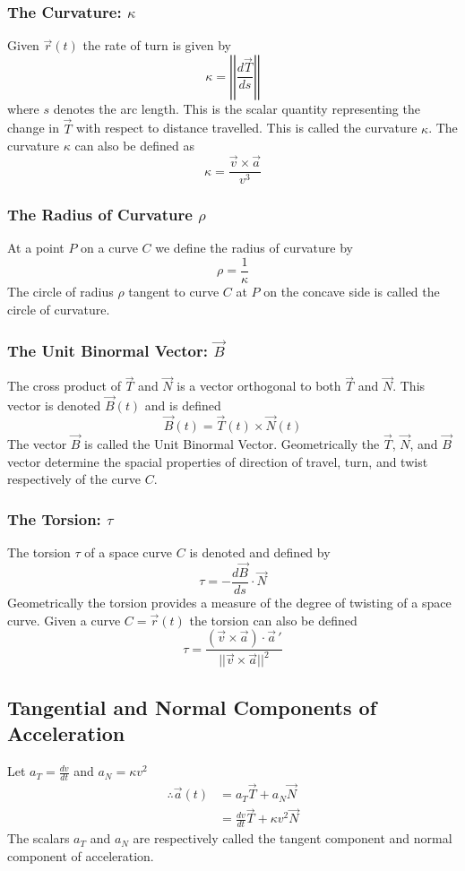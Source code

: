 \documentclass[14pt]{article}
\begin{document}
    \subsubsection{The Curvature: $\kappa$}
    Given $\vec r(t)$ the rate of turn is given by $$\kappa=\left|\left|\frac{d\vec T}{ds}\right|\right|$$ where $s$ denotes the arc length. This is the scalar quantity representing the change in $\vec T$ with respect to distance  travelled. This is called the curvature $\kappa$. The curvature $\kappa$ can also be defined as
    $$\kappa=\frac{\vec{v}\times\vec{a}}{v^3}$$
    \subsubsection{The Radius of Curvature $\rho$}
    At a point $P$ on a curve $C$ we define the radius of curvature by
    $$\rho=\frac{1}{\kappa}$$
    The circle of radius $\rho$ tangent to curve $C$ at $P$ on the concave side is called the circle of curvature.
    \subsubsection{The Unit Binormal Vector: $\vec B$}
    The cross product of $\vec T$ and $\vec N$ is a vector orthogonal to both $\vec T$ and $\vec N$. This vector is denoted $\vec B(t)$ and is defined
    $$\vec B(t)=\vec T(t)\times \vec N(t)$$
    The vector $\vec B$ is called the Unit Binormal Vector. Geometrically the $\vec T$, $\vec N$, and $\vec B$ vector determine the spacial properties of direction of travel, turn, and twist respectively of the curve $C$.
    \subsubsection{The Torsion: $\tau$}
    The torsion $\tau$ of a space curve $C$ is denoted and defined by 
    $$\tau=-\frac{d\vec B}{ds}\cdot\vec N$$
    Geometrically the torsion provides a measure of the degree of twisting of a space curve. Given a curve $C=\vec r(t)$ the torsion can also be defined
    $$\tau=\frac{(\vec v\times \vec a)\cdot\vec a\,'}{||\vec v\times\vec a||^2}$$
    \subsection{Tangential and Normal Components of Acceleration}
    Let $a_T=\frac{dv}{dt}$ and $a_N=\kappa v^2$
    \begin{align*}
        \therefore \vec a(t)&=a_T \vec T+ a_N \vec N\\
        &=\frac{dv}{dt}\vec T+\kappa v^2\vec N
    \end{align*}
    The scalars $a_T$ and $a_N$ are respectively called the tangent component and normal component of acceleration.
\end{document}
